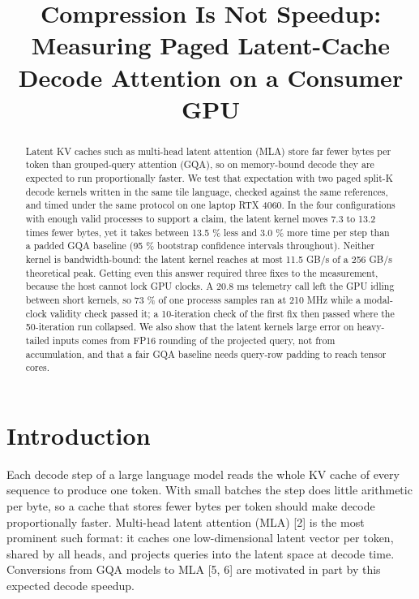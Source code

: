 \documentclass[conference]{IEEEtran}
\begin{document}
\title{Compression Is Not Speedup: Measuring Paged Latent-Cache Decode Attention on a Consumer GPU}
\author{}
\maketitle
\thispagestyle{plain}\pagestyle{plain}
\begin{abstract}
Latent KV caches such as multi-head latent attention (MLA) store far fewer bytes per token than grouped-query attention (GQA), so on memory-bound decode they are expected to run proportionally faster. We test that expectation with two paged split-K decode kernels written in the same tile language, checked against the same references, and timed under the same protocol on one laptop RTX 4060. In the four configurations with enough valid processes to support a claim, the latent kernel moves 7.3 to 13.2 times fewer bytes, yet it takes between 13.5 \% less and 3.0 \% more time per step than a padded GQA baseline (95 \% bootstrap confidence intervals throughout). Neither kernel is bandwidth-bound: the latent kernel reaches at most 11.5 GB/s of a 256 GB/s theoretical peak. Getting even this answer required three fixes to the measurement, because the host cannot lock GPU clocks. A 20.8 ms telemetry call left the GPU idling between short kernels, so 73 \% of one process\textquotesingle s samples ran at 210 MHz while a modal-clock validity check passed it; a 10-iteration check of the first fix then passed where the 50-iteration run collapsed. We also show that the latent kernel\textquotesingle s large error on heavy-tailed inputs comes from FP16 rounding of the projected query, not from accumulation, and that a fair GQA baseline needs query-row padding to reach tensor cores.
\end{abstract}

\section{Introduction}\label{sec:1}

Each decode step of a large language model reads the whole KV cache of every sequence to produce one token. With small batches the step does little arithmetic per byte, so a cache that stores fewer bytes per token should make decode proportionally faster. Multi-head latent attention (MLA) {[}2{]} is the most prominent such format: it caches one low-dimensional latent vector per token, shared by all heads, and projects queries into the latent space at decode time. Conversions from GQA models to MLA {[}5, 6{]} are motivated in part by this expected decode speedup.
\end{document}
